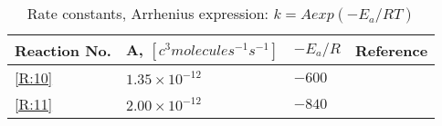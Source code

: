 \begin{table}[h]
\centering
\begin{tabular}{|l|l|l|l|}
\hline
Reaction No.               & A, $[c^3molecules^{-1}s^{-1}]$ & $-E_a/R$ & Reference                     \\ \hline
\ref{R:10}  & $1.35\times10^{-12}$         & $-600$   & \cite{Sander} \\
\ref{R:11} & $2.00\times10^{-12}$         & $-840$   & \cite{Sander} \\ \hline
\end{tabular}
\label{tab:rr_ocean_emis}
\caption{Rate constants, Arrhenius expression: $k = Aexp(-E_a/RT)$ \cite{Sander}}
\end{table}